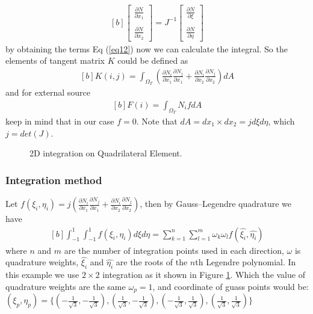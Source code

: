 \documentclass[]{article}
\begin{document}
\begin{equation}\label{eq16}
	\begin{aligned}[b]
\begin{bmatrix}
	\frac{\partial N}{\partial x_{1}}\\
	\\
	\frac{\partial N}{\partial x_{2}}  
\end{bmatrix}
= J^{-1}
\begin{bmatrix}
	\frac{\partial N}{\partial \xi}\\
	\\
	\frac{\partial N}{\partial \eta}
\end{bmatrix}
	\end{aligned}
\end{equation}
 by obtaining the terms Eq (\ref{eq12}) now we can calculate the integral. So the elements of tangent matrix $K$ could be defined as
\begin{equation}\label{eq17}
	\begin{aligned}[b]
		K(i,j) = \int_{\Omega_{T}} (\frac{\partial N_{i}}{\partial x_{1}}
		\frac{\partial N_{j}}{\partial x_{1}}+\frac{\partial N_{i}}{\partial x_{2}} 
		\frac{\partial N_{j}}{\partial x_{2}}) dA
	\end{aligned}
\end{equation}
and for external source 
\begin{equation}\label{eq18}
	\begin{aligned}[b]
		F(i) = \int_{\Omega_{T}} N_{i}f dA
	\end{aligned}
\end{equation}
keep in mind that in our case $f=0$. Note that $dA=dx_{1} \times dx_{2}=jd\xi d\eta$, which $j=det(J)$.
\begin{figure}[htbp]
	\centering
	
	\caption{2D integration on Quadrilateral Element.}
	\label{fig_int}
\end{figure} 
\subsubsection{Integration method} \label{sec: int}
Let $f(\xi_{i},\eta_{i})=j(\frac{\partial N_{i}}{\partial x_{1}}
\frac{\partial N_{j}}{\partial x_{1}}+\frac{\partial N_{i}}{\partial x_{2}} 
\frac{\partial N_{j}}{\partial x_{2}})$, then by Gauss–Legendre quadrature we have
\begin{equation}\label{eq19}
	\begin{aligned}[b]
		\int_{-1}^1 \int_{-1}^1 f(\xi_{i},\eta_{i}) d\xi d\eta = \sum_{k=1}^{n}\sum_{l=1}^{m} \omega_{k}\omega_{l}f(\hat{\xi_{i}},\hat{\eta_{i}})
	\end{aligned}
\end{equation}
where $n$ and $m$ are the number of integration points used in each direction, $\omega$ is quadrature weights, $\hat{\xi_{i}}$ and $\hat{\eta_{i}}$ are the roots of the $n$th Legendre polynomial. In this example we use $2 \times 2$ integration as it shown in Figure \ref{fig_int}. Which the value of  quadrature weights are the same $\omega_{p}=1$, and coordinate of guass points would be:  $(\xi_{p}, \eta_{p})=\{(-\frac{1}{\sqrt{3}},-\frac{1}{\sqrt{3}}),  (\frac{1}{\sqrt{3}}, -\frac{1}{\sqrt{3}}),  (-\frac{1}{\sqrt{3}}, \frac{1}{\sqrt{3}}), (\frac{1}{\sqrt{3}}, \frac{1}{\sqrt{3}})\}$
\end{document}
